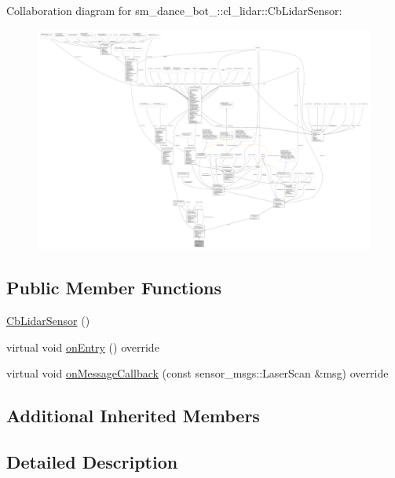 Collaboration diagram for sm\+\_\+dance\+\_\+bot\+\_\+:\+:cl\+\_\+lidar\+:\+:Cb\+Lidar\+Sensor\+:
\nopagebreak
\begin{figure}[H]
\begin{center}
\leavevmode
\includegraphics[width=350pt]{structsm__dance__bot__2_1_1cl__lidar_1_1CbLidarSensor__coll__graph}
\end{center}
\end{figure}
\subsection*{Public Member Functions}
\begin{DoxyCompactItemize}
\item 
\hyperlink{structsm__dance__bot__2_1_1cl__lidar_1_1CbLidarSensor_adefa67838fa6009639646c0478608ae3}{Cb\+Lidar\+Sensor} ()
\item 
virtual void \hyperlink{structsm__dance__bot__2_1_1cl__lidar_1_1CbLidarSensor_aad4085c114dd98c5e857d1a71c0309f8}{on\+Entry} () override
\item 
virtual void \hyperlink{structsm__dance__bot__2_1_1cl__lidar_1_1CbLidarSensor_a62e47011ef05a3d475da88c7c17a9861}{on\+Message\+Callback} (const sensor\+\_\+msgs\+::\+Laser\+Scan \&msg) override
\end{DoxyCompactItemize}
\subsection*{Additional Inherited Members}


\subsection{Detailed Description}


